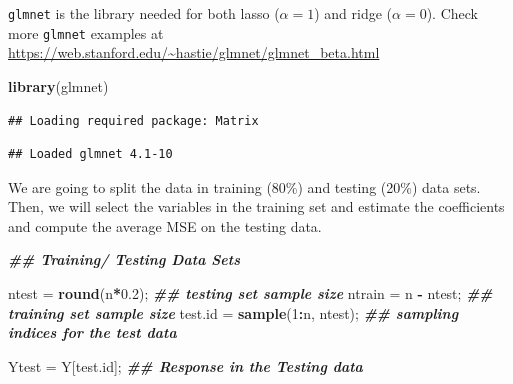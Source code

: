 \documentclass[
]{book}
\newenvironment{Shaded}{\begin{snugshade}}{\end{snugshade}}
\newcommand{\DecValTok}[1]{\textcolor[rgb]{0.00,0.00,0.81}{#1}}
\newcommand{\DocumentationTok}[1]{\textcolor[rgb]{0.56,0.35,0.01}{\textbf{\textit{#1}}}}
\newcommand{\FloatTok}[1]{\textcolor[rgb]{0.00,0.00,0.81}{#1}}
\newcommand{\FunctionTok}[1]{\textcolor[rgb]{0.13,0.29,0.53}{\textbf{#1}}}
\newcommand{\NormalTok}[1]{#1}
\newcommand{\OtherTok}[1]{\textcolor[rgb]{0.56,0.35,0.01}{#1}}
\newcommand{\SpecialCharTok}[1]{\textcolor[rgb]{0.81,0.36,0.00}{\textbf{#1}}}
\newcommand{\StringTok}[1]{\textcolor[rgb]{0.31,0.60,0.02}{#1}}
\begin{document}
\texttt{glmnet} is the library needed for both lasso (\(\alpha=1\)) and ridge (\(\alpha=0\)). Check more \texttt{glmnet} examples at \url{https://web.stanford.edu/~hastie/glmnet/glmnet_beta.html}

\begin{Shaded}
\begin{Highlighting}[]
\FunctionTok{library}\NormalTok{(glmnet)}
\end{Highlighting}
\end{Shaded}

\begin{verbatim}
## Loading required package: Matrix
\end{verbatim}

\begin{verbatim}
## Loaded glmnet 4.1-10
\end{verbatim}

\begin{Shaded}
\end{Shaded}

We are going to split the data in training (80\%) and testing (20\%) data sets. Then, we will select the variables in the training set and estimate the coefficients and compute the average MSE on the testing data.

\begin{Shaded}
\begin{Highlighting}[]
\DocumentationTok{\#\# Training/ Testing Data Sets}

\NormalTok{ntest }\OtherTok{=} \FunctionTok{round}\NormalTok{(n}\SpecialCharTok{*}\FloatTok{0.2}\NormalTok{);    }\DocumentationTok{\#\# testing set sample size}
\NormalTok{ntrain }\OtherTok{=}\NormalTok{ n }\SpecialCharTok{{-}}\NormalTok{ ntest;      }\DocumentationTok{\#\# training set sample size}
\NormalTok{test.id }\OtherTok{=} \FunctionTok{sample}\NormalTok{(}\DecValTok{1}\SpecialCharTok{:}\NormalTok{n, ntest);   }\DocumentationTok{\#\# sampling indices for the test data}

\NormalTok{Ytest }\OtherTok{=}\NormalTok{ Y[test.id]; }\DocumentationTok{\#\# Response in the Testing data}
\end{Highlighting}
\end{Shaded}
\end{document}

